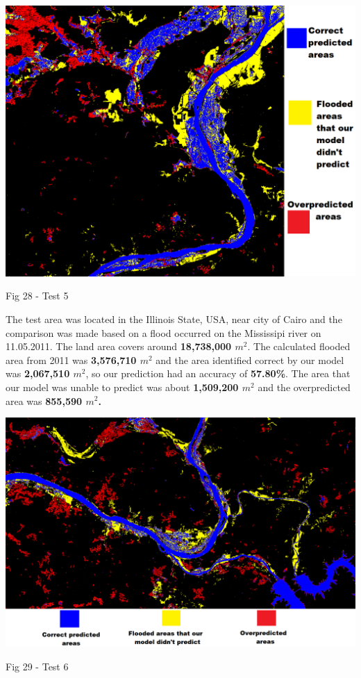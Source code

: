 \documentclass[12pt, a4paper]{report}
\begin{document}
\bigskip
\includegraphics[scale=0.5, center]{test_5.png}
\begin{center}
Fig 28 - Test 5
\end{center}
\par 

The test area was located in the Illinois State, USA, near city of Cairo and the comparison was made based on a flood occurred on the Mississipi river on 11.05.2011. The land area covers around \textbf{18,738,000 $m^2$}. The calculated flooded area from 2011 was \textbf{3,576,710 $m^2$} and the area identified correct by our model was \textbf{2,067,510 $m^2$}, so our prediction had an accuracy of \textbf{57.80\%}. The area that our model was unable to predict was about \textbf{1,509,200 $m^2$} and the overpredicted area was \textbf{855,590 $m^2$.}

\newpage

\bigskip
\includegraphics[scale=0.4, center]{test_6.png}
\begin{center}
Fig 29 - Test 6
\end{center}
\par 
\end{document}
